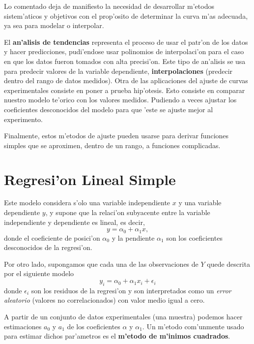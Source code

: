 \documentclass[letterpaper,11pt]{report}
\begin{document}
Lo comentado deja de manifiesto la necesidad de desarrollar m'etodos sistem'aticos y objetivos con el prop'osito de determinar la curva m'as adecuada, ya sea para modelar o interpolar.

El \textbf{an'alisis de tendencias} representa el proceso de usar el patr'on de los datos y hacer predicciones, pudi'endose usar polinomios de interpolaci'on para el caso en que los datos fueron tomados con alta precisi'on. Este tipo de an'alisis se usa para predecir valores de la variable dependiente, \textbf{interpolaciones} (predecir dentro del rango de datos medidos).
Otra de las aplicaciones del ajuste de curvas experimentales consiste en poner a prueba hip'otesis. Esto consiste en comparar nuestro modelo te'orico con los valores medidos. Pudiendo a veces ajustar los coeficientes desconocidos del modelo para que 'este se ajuste mejor al experimento.

Finalmente, estos m'etodos de ajuste pueden usarse para derivar funciones simples que se aproximen, dentro de un rango, a funciones complicadas.

\section{Regresi'on Lineal Simple}

Este modelo considera s'olo una variable independiente $x$ y una variable dependiente $y$, y supone que la relaci'on subyacente entre la variable independiente y dependiente es lineal, es decir,
\begin{equation}
y =\alpha_0 + \alpha_1 x,
\end{equation}
donde el coeficiente de posici'on $\alpha_0$ y la pendiente $\alpha_1$ son los coeficientes desconocidos de la regresi'on. 

Por otro lado, supongamos que cada una de las observaciones de $Y$ quede descrita por el siguiente modelo
\begin{equation}
y_i=  \alpha_0 + \alpha_1 x_i +\epsilon_i
\end{equation}
donde $\epsilon_i$ son los residuos de la regresi'on y son interpretados como un \textit{error aleatorio} (valores no correlacionados) con valor medio igual a cero.

A partir de un conjunto de datos experimentales (una muestra) podemos hacer estimaciones $a_0$ y $a_1$ de los coeficientes $\alpha$ y $\alpha_1$.
Un m'etodo com'unmente usado para estimar dichos par'ametros es el \textbf{m'etodo de m'inimos cuadrados}. 
%
\end{document}
